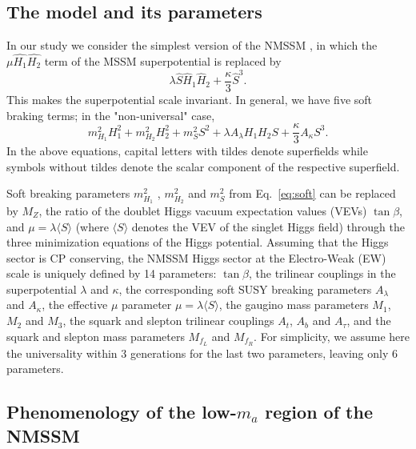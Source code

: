 \documentclass[aps,prl,twocolumn,nofootinbib,superscriptaddress]{revtex4}
\begin{document}
\subsection{The model and its parameters}
In our study we consider the simplest version of the NMSSM
\cite{Nilles:1982dy,Frere:1983ag,Ellis:1988er,%
Drees:1988fc,Ellwanger:1993hn,Ellwanger:1993xa,%
Elliott:1993bs,Pandita:1993tg,Ellwanger:1995ru,%
King:1995vk,Franke:1995tc,Ellwanger:1996gw},
in which the $\mu\widehat{H_1}\widehat{H_2}$ term of the 
MSSM superpotential is replaced by
\begin{equation}
\lambda  \widehat{S} \widehat{H}_1 \widehat{H}_2 + \frac{\kappa}{3}  \widehat{S}^3 \mbox{.}
\label{eq:superpot} 
\end{equation}
This makes the superpotential scale invariant.  In general, we have five
soft braking terms; in the "non-universal" case,
\begin{equation}
  m_{H_1}^2 H_1^2 + m_{H_2}^2 H_2^2  + m_{S}^2 S^2 
+ \lambda A_\lambda H_1 H_2 S +  \frac{\kappa}{3} A_\kappa S^3.
\label{eq:soft} 
\end{equation}
In the above equations, capital letters with tildes denote superfields
while symbols without tildes denote the scalar component of the respective
superfield.

Soft breaking parameters
$m_{H_1}^2$ , $m_{H_2}^2$  and $m_{S}^2$ 
from Eq.~\ref{eq:soft} can  be replaced by
$M_Z$, the ratio  of the doublet Higgs vacuum expectation values (VEVs) $\tan\beta$,
and $\mu = \lambda \langle S \rangle$
(where $\langle S \rangle$ denotes the VEV of the singlet Higgs field)
through the three minimization equations of the Higgs potential.
Assuming that the Higgs sector is CP conserving,
the NMSSM Higgs sector at the Electro-Weak (EW) scale is uniquely defined
by 14 parameters:
$\tan\beta$,
the trilinear couplings in the superpotential $\lambda$ and $\kappa$, the
corresponding soft SUSY breaking parameters $A_\lambda$ and $A_\kappa$,
the effective $\mu$ parameter $\mu = \lambda \langle S \rangle$,
the gaugino mass parameters $M_1$, $M_2$ and $M_3$,
the squark and slepton trilinear couplings
$A_{t}$,  $A_{b}$ and  $A_\tau$,
and the squark and slepton mass parameters $M_{f_L}$ and $M_{f_R}$.
For simplicity, we assume here the
universality within 3 generations for the last two parameters, leaving
only 6 parameters.

\subsection{Phenomenology of the low-$m_a$ region of the NMSSM}
\end{document}
